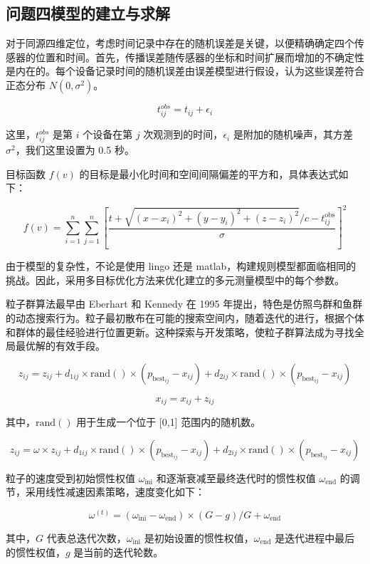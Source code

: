 \documentclass[withoutpreface,bwprint,12pt,a4paper]{cumcmthesis}
\begin{document}
\subsection{问题四模型的建立与求解}

对于同源四维定位，考虑时间记录中存在的随机误差是关键，以便精确确定四个传感器的位置和时间。首先，传播误差随传感器的坐标和时间扩展而增加的不确定性是内在的。每个设备记录时间的随机误差由误差模型进行假设，认为这些误差符合正态分布 \(N(0, \sigma^2)\)。

\[
t_{ij}^{obs} = t_{ij} + \epsilon_i
\]

这里，\(t_{ij}^{obs}\) 是第 \(i\) 个设备在第 \(j\) 次观测到的时间，\( \epsilon_i \) 是附加的随机噪声，其方差 \(\sigma^2\)，我们这里设置为 0.5 秒。

目标函数 \(f(v)\) 的目标是最小化时间和空间间隔偏差的平方和，具体表达式如下：

\[
f(v) = \sum_{i=1}^n \sum_{j=1}^n \left[ \frac{t + \sqrt{(x-x_i)^2 + (y-y_i)^2 + (z-z_i)^2}/{c} - t_{ij}^{\text{obs}}}{\sigma} \right]^2
\]

由于模型的复杂性，不论是使用 lingo 还是 matlab，构建规则模型都面临相同的挑战。因此，采用多目标优化方法来优化建立的多元测量模型中的每个参数。

粒子群算法最早由 Eberhart 和 Kennedy 在 1995 年提出，特色是仿照鸟群和鱼群的动态搜索行为。粒子最初散布在可能的搜索空间内，随着迭代的进行，根据个体和群体的最佳经验进行位置更新。这种探索与开发策略，使粒子群算法成为寻找全局最优解的有效手段。

\[
z_{ij} = z_{ij} + d_{1ij} \times \text{rand}() \times (p_{\text{best}_{ij}} - x_{ij}) + d_{2ij} \times \text{rand}() \times (p_{\text{best}_{ij}} - x_{ij})
\]

\[
x_{ij} = x_{ij} + z_{ij}
\]

其中，\( \text{rand}() \) 用于生成一个位于 [0,1] 范围内的随机数。

\[
z_{ij} = \omega \times z_{ij} + d_{1ij} \times \text{rand}() \times (p_{\text{best}_{ij}} - x_{ij}) + d_{2ij} \times \text{rand}() \times (p_{\text{best}_{ij}} - x_{ij})
\]

粒子的速度受到初始惯性权值 \(\omega_{\text{ini}}\) 和逐渐衰减至最终迭代时的惯性权值 \(\omega_{\text{end}}\) 的调节，采用线性减速因素策略，速度变化如下：

\[
\omega^{(t)} = (\omega_{\text{ini}} - \omega_{\text{end}}) \times (G - g) / G + \omega_{\text{end}}
\]

其中，\(G\) 代表总迭代次数，\(\omega_{\text{ini}}\) 是初始设置的惯性权值，\(\omega_{\text{end}}\) 是迭代进程中最后的惯性权值，\(g\) 是当前的迭代轮数。
\end{document}
